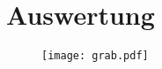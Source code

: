 \section{Auswertung}
\label{sec:Auswertung}

\begin{figure}[H]
	\centering
	\caption{}
	\texttt{[image: grab.pdf]}
	\label{fig:grab}
\end{figure}




